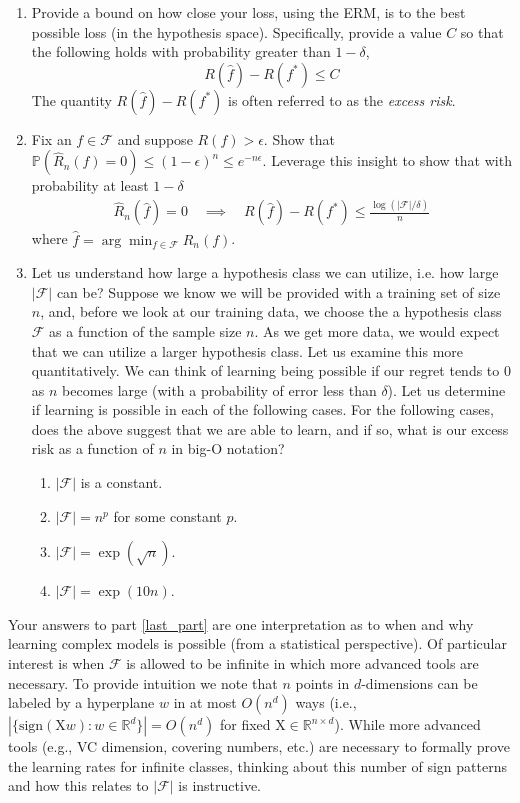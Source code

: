 \documentclass{article}
\newcommand{\field}[1]{\mathbb{#1}}
\newcommand{\1}{\mathbf{1}}
\renewcommand{\P}{\mathbb{P}} %
\newcommand{\R}{\field{R}} %
\begin{document}
\begin{enumerate}
\item Provide a bound on how close your loss, using the ERM, is
  to the best possible loss (in the hypothesis space). 
  Specifically, provide a value $C$ so that the following holds with probability greater than $1-\delta$,
  \[
  R(\widehat f) - R(f^*) \leq C
  \]
  The quantity $R(\widehat f) - R(f^*)$ is often referred to as the \emph{excess risk}.

\item Fix an $f \in \mathcal{F}$ and suppose $R(f) > \epsilon$. 
Show that $\P( \widehat{R}_n(f) = 0 ) \leq (1-\epsilon)^n \leq e^{-n \epsilon}$.
Leverage this insight to show that with probability at least $1-\delta$ 
\begin{align*}
\widehat{R}_n(\widehat{f})=0 \quad \implies \quad  R(\widehat f) - R(f^*) \leq \frac{\log(|\mathcal{F}|/\delta)}{n}
\end{align*}
where $\widehat f = \arg\min_{f\in\mathcal{F}} \widehat R_n(f)$. 

\item \label{last_part} Let us understand how large a hypothesis class we can utilize,
  i.e. how large $|\mathcal{F}|$ can be? Suppose we know we will be provided with a training set of
  size $n$, and, before we look at our training data, we choose the
  a hypothesis class $\mathcal{F}$ as a function of the sample size $n$. As we get
  more data, we would expect that we can utilize a larger hypothesis
  class. Let us examine this more quantitatively. We can think of
  learning being possible if our regret tends to $0$ as $n$ becomes
  large (with a probability of error less than  $\delta$). Let us determine if learning is possible in each of the
  following cases. For the following cases, does the above suggest that we are able to learn, and if so, what is our excess risk as a function of $n$ in big-O notation?
\begin{enumerate}
\item $|\mathcal{F}|$ is a constant.\\
\item $|\mathcal{F}|=n^p$ for some constant $p$.\\
\item $|\mathcal{F}|=\exp(\sqrt{n})$.\\
\item $|\mathcal{F}|=\exp(10 n)$. \\
\end{enumerate}
\end{enumerate}
Your answers to part \ref{last_part} are one interpretation as to when and why learning
complex models is possible (from a statistical perspective). 
Of particular interest is when $\mathcal{F}$ is allowed to be infinite in which more advanced tools are necessary. 
To provide intuition we note that $n$ points in $d$-dimensions can be labeled by a hyperplane $w$ in at most $O(n^d)$ ways (i.e., $|\{ \text{sign}(\mathrm{X} w) : w \in \R^d \}| = O(n^d)$ for fixed $\mathrm{X} \in \R^{n \times d}$).
While more advanced tools (e.g., VC dimension, covering numbers, etc.) are necessary to formally prove the learning rates for infinite classes, thinking about this number of sign patterns and how this relates to $|\mathcal{F}|$ is instructive.
\end{document}
